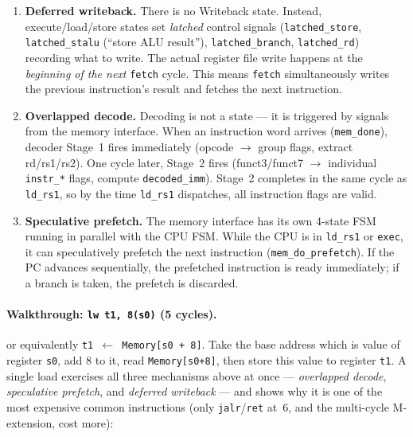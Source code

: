 \documentclass[9pt, a4paper]{extarticle}
\begin{document}
\begin{enumerate}
    \item \textbf{Deferred writeback.} There is no Writeback state. Instead, execute/load/store states set \emph{latched} control signals (\texttt{latched\_store}, \texttt{latched\_stalu} (``store ALU result''), \texttt{latched\_branch}, \texttt{latched\_rd}) recording what to write. The actual register file write happens at the \emph{beginning of the next} \texttt{fetch} cycle. This means \texttt{fetch} simultaneously writes the previous instruction's result and fetches the next instruction.

    \item \textbf{Overlapped decode.} Decoding is not a state --- it is triggered by signals from the memory interface. When an instruction word arrives (\texttt{mem\_done}), decoder Stage~1 fires immediately (opcode $\to$ group flags, extract rd/rs1/rs2). One cycle later, Stage~2 fires (funct3/funct7 $\to$ individual \texttt{instr\_*} flags, compute \texttt{decoded\_imm}). Stage~2 completes in the same cycle as \texttt{ld\_rs1}, so by the time \texttt{ld\_rs1} dispatches, all instruction flags are valid.

    \item \textbf{Speculative prefetch.} The memory interface has its own 4-state FSM running in parallel with the CPU FSM. While the CPU is in \texttt{ld\_rs1} or \texttt{exec}, it can speculatively prefetch the next instruction (\texttt{mem\_do\_prefetch}). If the PC advances sequentially, the prefetched instruction is ready immediately; if a branch is taken, the prefetch is discarded.
\end{enumerate}

\paragraph{Walkthrough: \texttt{lw t1, 8(s0)} (5 cycles).} or equivalently \texttt{t1  $\gets$  Memory[s0 + 8]}. Take the base address which is value of register \texttt{s0}, add 8 to it, read \texttt{Memory[s0+8]}, then store this value to register \texttt{t1}. A single load exercises all three mechanisms above at once --- \emph{overlapped decode}, \emph{speculative prefetch}, and \emph{deferred writeback} --- and shows why it is one of the most expensive common instructions (only \texttt{jalr}/\texttt{ret} at~6, and the multi-cycle M-extension, cost more):
\end{document}
